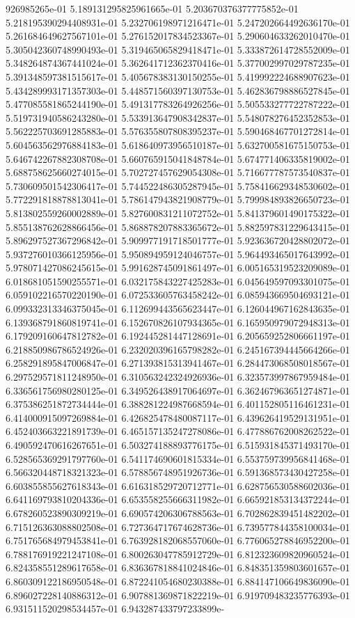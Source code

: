 926985265e-01	5.189131295825961665e-01	5.203670376377775852e-01	5.218195390294408931e-01	5.232706198971216471e-01	5.247202664492636170e-01	5.261684649627567101e-01	5.276152017834523367e-01	5.290604633262010470e-01	5.305042360748990493e-01	5.319465065829418471e-01	5.333872614728552009e-01	5.348264874367441024e-01	5.362641712362370416e-01	5.377002997029787235e-01	5.391348597381515617e-01	5.405678383130150255e-01	5.419992224688907623e-01	5.434289993171357303e-01	5.448571560397130753e-01	5.462836798886527845e-01	5.477085581865244190e-01	5.491317783264926256e-01	5.505533277722787222e-01	5.519731940586243280e-01	5.533913647908342837e-01	5.548078276452352853e-01	5.562225703691285883e-01	5.576355807808395237e-01	5.590468467701272814e-01	5.604563562976884183e-01	5.618640973956510187e-01	5.632700581675150753e-01	5.646742267882308708e-01	5.660765915041848784e-01	5.674771406335819002e-01	5.688758625660274015e-01	5.702727457629054308e-01	5.716677787573540837e-01	5.730609501542306417e-01	5.744522486305287945e-01	5.758416629348530602e-01	5.772291818878813041e-01	5.786147943821908779e-01	5.799984893826650723e-01	5.813802559260002889e-01	5.827600831211072752e-01	5.841379601490175322e-01	5.855138762628866456e-01	5.868878207883365672e-01	5.882597831229643415e-01	5.896297527367296842e-01	5.909977191718501777e-01	5.923636720428802072e-01	5.937276010366125956e-01	5.950894959124046757e-01	5.964493465017643992e-01	5.978071427086245615e-01	5.991628745091861497e-01	6.005165319523209089e-01	6.018681051590255571e-01	6.032175843227425283e-01	6.045649597093301075e-01	6.059102216570220190e-01	6.072533605763458242e-01	6.085943669504693121e-01	6.099332313346375045e-01	6.112699443565623447e-01	6.126044967162843635e-01	6.139368791860819741e-01	6.152670826107934365e-01	6.165950979072948313e-01	6.179209160647812782e-01	6.192445281447128691e-01	6.205659252806661197e-01	6.218850986786524926e-01	6.232020396165798282e-01	6.245167394445664266e-01	6.258291895847006847e-01	6.271393815313941467e-01	6.284473068508018567e-01	6.297529571811248950e-01	6.310563242324926936e-01	6.323573997867959484e-01	6.336561756980280125e-01	6.349526438917064697e-01	6.362467963651274871e-01	6.375386251872734444e-01	6.388281224987668594e-01	6.401152805116461231e-01	6.414000915097269884e-01	6.426825478480087117e-01	6.439626419529131951e-01	6.452403663221891739e-01	6.465157135247278086e-01	6.477886762008262522e-01	6.490592470616267651e-01	6.503274188893776175e-01	6.515931845371493170e-01	6.528565369291797760e-01	6.541174690601815334e-01	6.553759739956841468e-01	6.566320448718321323e-01	6.578856748951926736e-01	6.591368573430427258e-01	6.603855855627618343e-01	6.616318529720712771e-01	6.628756530588602036e-01	6.641169793810204336e-01	6.653558255666311982e-01	6.665921853134372244e-01	6.678260523890309219e-01	6.690574206306788563e-01	6.702862839451482202e-01	6.715126363088802508e-01	6.727364717674628736e-01	6.739577844358100034e-01	6.751765684979453841e-01	6.763928182068557060e-01	6.776065278846952200e-01	6.788176919221247108e-01	6.800263047785912729e-01	6.812323609820960524e-01	6.824358551289617658e-01	6.836367818841024846e-01	6.848351359803601657e-01	6.860309122186950548e-01	6.872241054680230388e-01	6.884147106649836090e-01	6.896027228140886312e-01	6.907881369871822219e-01	6.919709483235776393e-01	6.931511520298534457e-01	6.943287433797233899e-